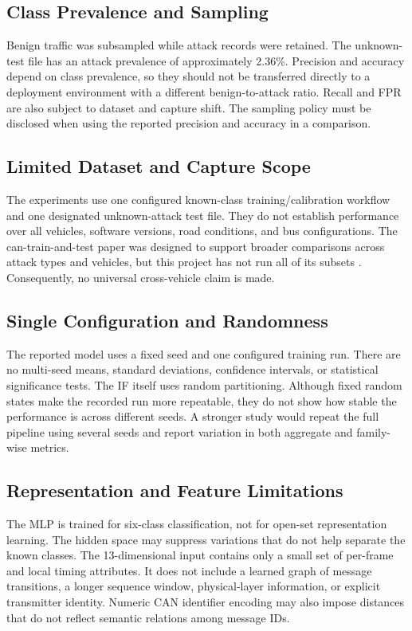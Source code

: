 \documentclass[journal]{IEEEtran}
\begin{document}
\subsection{Class Prevalence and Sampling}
Benign traffic was subsampled while attack records were retained. The unknown-test file has an attack prevalence of approximately 2.36\%. Precision and accuracy depend on class prevalence, so they should not be transferred directly to a deployment environment with a different benign-to-attack ratio. Recall and FPR are also subject to dataset and capture shift. The sampling policy must be disclosed when using the reported precision and accuracy in a comparison.

\subsection{Limited Dataset and Capture Scope}
The experiments use one configured known-class training/calibration workflow and one designated unknown-attack test file. They do not establish performance over all vehicles, software versions, road conditions, and bus configurations. The can-train-and-test paper was designed to support broader comparisons across attack types and vehicles, but this project has not run all of its subsets \cite{lampe2024dataset}. Consequently, no universal cross-vehicle claim is made.

\subsection{Single Configuration and Randomness}
The reported model uses a fixed seed and one configured training run. There are no multi-seed means, standard deviations, confidence intervals, or statistical significance tests. The IF itself uses random partitioning. Although fixed random states make the recorded run more repeatable, they do not show how stable the performance is across different seeds. A stronger study would repeat the full pipeline using several seeds and report variation in both aggregate and family-wise metrics.

\subsection{Representation and Feature Limitations}
The MLP is trained for six-class classification, not for open-set representation learning. The hidden space may suppress variations that do not help separate the known classes. The 13-dimensional input contains only a small set of per-frame and local timing attributes. It does not include a learned graph of message transitions, a longer sequence window, physical-layer information, or explicit transmitter identity. Numeric CAN identifier encoding may also impose distances that do not reflect semantic relations among message IDs.
\end{document}
